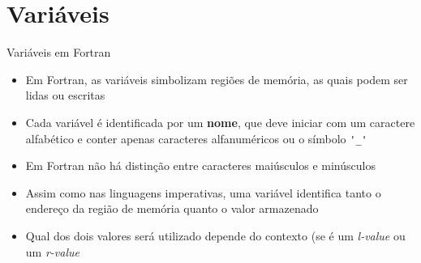 \section{Variáveis}

\begin{frame}[fragile]{Variáveis em Fortran}

    \begin{itemize}
        \item Em Fortran, as variáveis simbolizam regiões de memória, as quais podem ser 
            lidas ou escritas

        \item Cada variável é identificada por um \textbf{nome}, que deve iniciar com um
            caractere alfabético e conter apenas caracteres alfanuméricos ou o símbolo 
            \verb|'_'|

        \item Em Fortran não há distinção entre caracteres maiúsculos e minúsculos

        \item Assim como nas linguagens imperativas, uma variável identifica tanto o endereço
            da região de memória quanto o valor armazenado

        \item Qual dos dois valores será utilizado depende do contexto (se é um \textit{l-value} ou
            um \textit{r-value}

    \end{itemize}

\end{frame}

